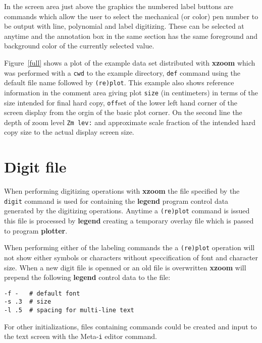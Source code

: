 In the screen area just above the graphics the numbered
label buttons are commands which allow the user to select
the mechanical (or color) pen number to be output with
line, polynomial and label digitizing.
These can be selected at anytime and the
annotation box in the same section has the same foreground
and background color of the currently selected value.
\begin{figure*}[t]
\vspace{4.8in}
\caption{{\bf Xzoom} display of example overlay set.}
\label{full}
\end{figure*}

Figure~\ref{full} shows a plot of the example data set
distributed with {\bf xzoom} which was performed with a
{\tt cwd} to the example directory, {\tt def} command
using the default file name followed by {\tt (re)plot}.
This example also shows reference information in the
comment area giving plot {\tt size} (in centimeters) in terms of
the size intended for final hard copy, {\tt off}set of the lower
left hand corner of the screen display from the orgin of
the basic plot corner.
On the second line the depth of zoom level {\tt Zm lev:} and
approximate scale fraction of the intended
hard copy size to the actual display screen size.

\section{Digit file}
When performing digitizing operations with {\bf xzoom}
the file specified by the {\tt digit} command is
used for containing the {\bf legend} program control data
generated by the digitizing operations.
Anytime a {\tt (re)plot} command is issued this file
is processed by {\bf legend} creating a temporary overlay
file which is passed to program {\bf plotter}.

When performing either of the labeling commands the
a {\tt (re)plot} operation will not show either symbols
or characters without speccification of font and character size.
When a new digit file is openned or an old file is overwritten
{\bf xzoom} will prepend the following {\bf legend} control data
to the file:
\begin{verbatim}
-f -   # default font
-s .3  # size
-l .5  # spacing for multi-line text
\end{verbatim}
For other initializations, files containing commands
could be created and input to the text screen with
the Meta-{\tt i} editor command.

